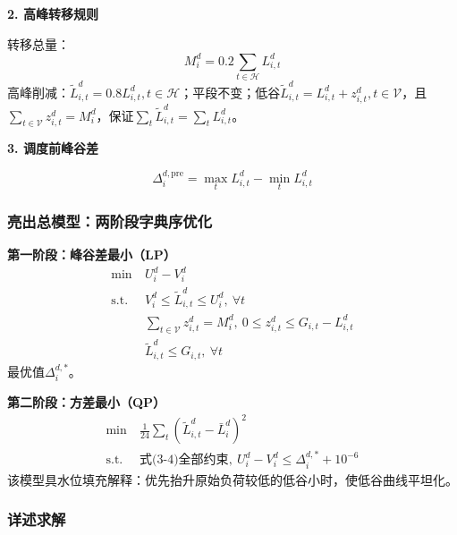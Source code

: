 \documentclass[a4paper,12pt]{ctexart}
\begin{document}
\textbf{2. 高峰转移规则}

转移总量：
\begin{equation}
M_{i}^{d}=0.2\sum_{t\in\mathcal{H}}L_{i,t}^{d}\tag{3-2}
\end{equation}
高峰削减：$\widetilde{L}_{i,t}^{d}=0.8L_{i,t}^{d},t\in\mathcal{H}$；平段不变；低谷$\widetilde{L}_{i,t}^{d}=L_{i,t}^{d}+z_{i,t}^{d},t\in\mathcal{V}$，且$\sum_{t\in\mathcal{V}}z_{i,t}^{d}=M_{i}^{d}$，保证$\sum_{t}\widetilde{L}_{i,t}^{d}=\sum_{t}L_{i,t}^{d}$。

\textbf{3. 调度前峰谷差}

\begin{equation}
\Delta_{i}^{d,\mathrm{pre}}=\max_{t}L_{i,t}^{d}-\min_{t}L_{i,t}^{d}\tag{3-3}
\end{equation}

\subsubsection{亮出总模型：两阶段字典序优化}

\textbf{第一阶段：峰谷差最小（LP）}
\begin{equation}
\begin{aligned}
\min\ & U_{i}^{d}-V_{i}^{d}\\
\mathrm{s.t.}\ & V_{i}^{d}\le\widetilde{L}_{i,t}^{d}\le U_{i}^{d},\ \forall t\\
& \sum_{t\in\mathcal{V}}z_{i,t}^{d}=M_{i}^{d},\ 0\le z_{i,t}^{d}\le G_{i,t}-L_{i,t}^{d}\\
& \widetilde{L}_{i,t}^{d}\le G_{i,t},\ \forall t
\end{aligned}\tag{3-4}
\end{equation}
最优值$\Delta_{i}^{d,*}$。

\textbf{第二阶段：方差最小（QP）}
\begin{equation}
\begin{aligned}
\min\ & \frac{1}{24}\sum_{t}(\widetilde{L}_{i,t}^{d}-\bar{L}_{i}^{d})^{2}\\
\mathrm{s.t.}\ & \text{式(3-4)全部约束},\ U_{i}^{d}-V_{i}^{d}\le\Delta_{i}^{d,*}+10^{-6}
\end{aligned}\tag{3-5}
\end{equation}
该模型具水位填充解释：优先抬升原始负荷较低的低谷小时，使低谷曲线平坦化。

\subsubsection{详述求解}
\end{document}
